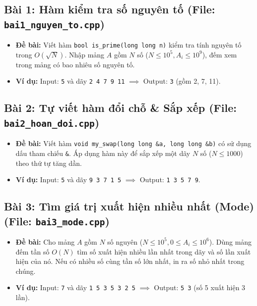 \documentclass[11pt,a4paper]{article}
\begin{document}
\subsection*{\color{AsianDarkBlue}\normalsize Bài 1: Hàm kiểm tra số nguyên tố (File: \texttt{bai1\_nguyen\_to.cpp})}
\begin{itemize}
    \setlength{\itemsep}{1pt}
    \small
    \item \textbf{Đề bài:} Viết hàm \texttt{bool is\_prime(long long n)} kiểm tra tính nguyên tố trong $O(\sqrt{N})$. Nhập mảng $A$ gồm $N$ số ($N \le 10^5, A_i \le 10^9$), đếm xem trong mảng có bao nhiêu số nguyên tố.
    \item \textbf{Ví dụ:} Input: \texttt{5} và dãy \texttt{2 4 7 9 11} $\implies$ Output: \texttt{3} (gồm 2, 7, 11).
\end{itemize}

\vspace{-0.2cm}
\subsection*{\color{AsianDarkBlue}\normalsize Bài 2: Tự viết hàm đổi chỗ \& Sắp xếp (File: \texttt{bai2\_hoan\_doi.cpp})}
\begin{itemize}
    \setlength{\itemsep}{1pt}
    \small
    \item \textbf{Đề bài:} Viết hàm \texttt{void my\_swap(long long \&a, long long \&b)} có sử dụng dấu tham chiếu \texttt{\&}. Áp dụng hàm này để sắp xếp một dãy $N$ số ($N \le 1000$) theo thứ tự tăng dần.
    \item \textbf{Ví dụ:} Input: \texttt{5} và dãy \texttt{9 3 7 1 5} $\implies$ Output: \texttt{1 3 5 7 9}.
\end{itemize}

\vspace{-0.2cm}
\subsection*{\color{AsianDarkBlue}\normalsize Bài 3: Tìm giá trị xuất hiện nhiều nhất (Mode) (File: \texttt{bai3\_mode.cpp})}
\begin{itemize}
    \setlength{\itemsep}{1pt}
    \small
    \item \textbf{Đề bài:} Cho mảng $A$ gồm $N$ số nguyên ($N \le 10^5, 0 \le A_i \le 10^6$). Dùng mảng đếm tần số $O(N)$ tìm số xuất hiện nhiều lần nhất trong dãy và số lần xuất hiện của nó. Nếu có nhiều số cùng tần số lớn nhất, in ra số nhỏ nhất trong chúng.
    \item \textbf{Ví dụ:} Input: \texttt{7} và dãy \texttt{1 5 3 5 3 2 5} $\implies$ Output: \texttt{5 3} (số 5 xuất hiện 3 lần).
\end{itemize}
\end{document}
